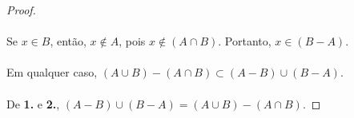 \documentclass[11pt,a4paper]{report}
\begin{document}
\begin{proof}
    \paragraph{}
    Se $x \in B$, então, $x \not\in A$, pois $x \not\in (A \cap B)$. Portanto, $x \in (B - A)$.

    \paragraph{}
    Em qualquer caso, $(A \cup B) - (A \cap B) \subset (A - B) \cup (B - A)$. 
    
    \paragraph{}
    De \textbf{1.} e \textbf{2.}, $(A - B) \cup (B - A) = (A \cup B) - (A \cap B)$.
    \end{proof}
\end{document}
